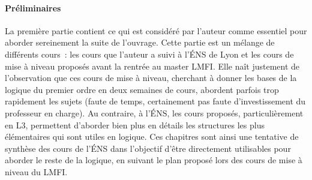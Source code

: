\paragraph{Préliminaires}
La première partie contient ce qui est considéré par l'auteur comme essentiel
pour aborder sereinement la suite de l'ouvrage. Cette partie est un mélange de
différents cours~: les cours que l'auteur a suivi à l'\'ENS de Lyon et les
cours de mise à niveau proposés avant la rentrée au master LMFI. Elle naît
justement de l'observation que ces cours de mise à niveau, cherchant à donner
les bases de la logique du premier ordre en deux semaines de cours, abordent
parfois trop rapidement les sujets (faute de temps, certainement pas faute
d'investissement du professeur en charge). Au contraire, à l'\'ENS, les cours
proposés, particulièrement en L3, permettent d'aborder bien plus en détails les
structures les plus élémentaires qui sont utiles en logique. Ces chapitres sont
ainsi une tentative de synthèse des cours de l'\'ENS dans l'objectif d'être
directement utilisables pour aborder le reste de la logique, en suivant le
plan proposé lors des cours de mise à niveau du LMFI.

